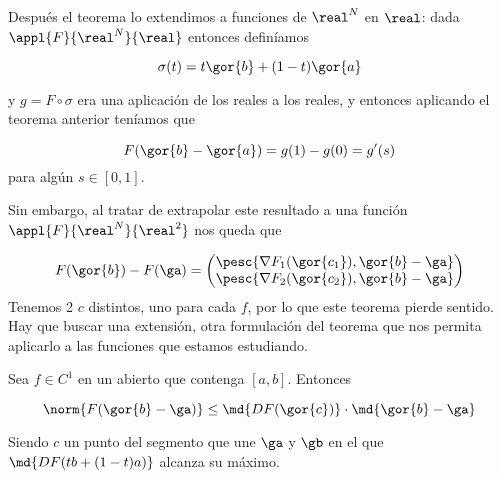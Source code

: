 Después el teorema lo extendimos a funciones de $\real^N$ en $\real$: dada $\appl{F}{\real^N}{\real}$ entonces definíamos
 
 \[ \sigma(t)  = t\gor{b}+(1-t)\gor{a} \] 
 
 y $g = F\circ \sigma$ era una aplicación de los reales a los reales, y entonces aplicando el teorema anterior teníamos que 
 
 \[ F(\gor{b}-\gor{a}) = g(1)-g(0)  = g'(s) \] 
 para algún $s\in[0,1]$.

Sin embargo, al tratar de extrapolar este resultado a una función $\appl{F}{\real^N}{\real^2}$ nos queda que 

 \[ F(\gor{b})-F(\ga) = \begin{pmatrix}
                         \pesc{\nabla F_1(\gor{c_1}),{\gor{b}-\ga}}\\
                         \pesc{\nabla F_2(\gor{c_2}),\gor{b}-\ga}
                        \end{pmatrix}
 \]
  Tenemos 2 $c$ distintos, uno para cada $f$, por lo que este teorema pierde sentido. Hay que buscar una extensión, otra formulación del teorema que nos permita aplicarlo a las funciones que estamos estudiando.
  
  \begin{theorem} 
  Sea $f \in C^1$ en un abierto que contenga $[a,b]$. Entonces 
  
  \[ \norm{F(\gor{b}-\ga)} \leq \md{DF(\gor{c})} \cdot \md{\gor{b}-\ga} \]
  
  Siendo $c$ un punto del segmento que une $\ga$ y $\gb$ en el que $\md{DF(tb+(1-t)a)}$ alcanza su máximo.
  \end{theorem}  
  
